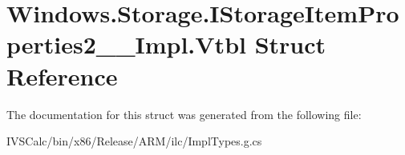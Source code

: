 \hypertarget{struct_windows_1_1_storage_1_1_i_storage_item_properties2_____impl_1_1_vtbl}{}\section{Windows.\+Storage.\+I\+Storage\+Item\+Properties2\+\_\+\+\_\+\+Impl.\+Vtbl Struct Reference}
\label{struct_windows_1_1_storage_1_1_i_storage_item_properties2_____impl_1_1_vtbl}


The documentation for this struct was generated from the following file\+:\begin{DoxyCompactItemize}
\item 
I\+V\+S\+Calc/bin/x86/\+Release/\+A\+R\+M/ilc/Impl\+Types.\+g.\+cs\end{DoxyCompactItemize}
